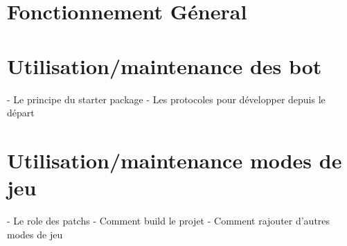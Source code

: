 \section{Fonctionnement Géneral} 

\section{Utilisation/maintenance des bot}
	- Le principe du starter package 
	- Les protocoles pour développer depuis le départ

\section{Utilisation/maintenance modes de jeu}
	- Le role des patchs
	- Comment build le projet
	- Comment rajouter d'autres modes de jeu

